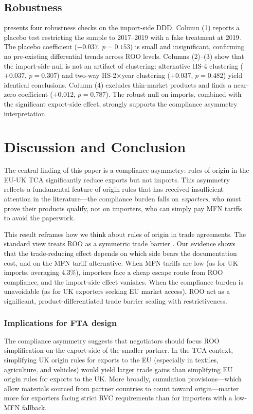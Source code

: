 \documentclass[12pt]{article}
\begin{document}
\subsection{Robustness}



 presents four robustness checks on the import-side DDD. Column (1) reports a placebo test restricting the sample to 2017--2019 with a fake treatment at 2019. The placebo coefficient ($-0.037$, $p = 0.153$) is small and insignificant, confirming no pre-existing differential trends across ROO levels. Columns (2)--(3) show that the import-side null is not an artifact of clustering: alternative HS-4 clustering ($+0.037$, $p = 0.307$) and two-way HS-2$\times$year clustering ($+0.037$, $p = 0.482$) yield identical conclusions. Column (4) excludes thin-market products and finds a near-zero coefficient ($+0.012$, $p = 0.787$). The robust null on imports, combined with the significant export-side effect, strongly supports the compliance asymmetry interpretation.


\section{Discussion and Conclusion}

The central finding of this paper is a compliance asymmetry: rules of origin in the EU-UK TCA significantly reduce exports but not imports. This asymmetry reflects a fundamental feature of origin rules that has received insufficient attention in the literature---the compliance burden falls on \textit{exporters}, who must prove their products qualify, not on importers, who can simply pay MFN tariffs to avoid the paperwork.

This result reframes how we think about rules of origin in trade agreements. The standard view treats ROO as a symmetric trade barrier \citep{krishna2006, conconi2018}. Our evidence shows that the trade-reducing effect depends on which side bears the documentation cost, and on the MFN tariff alternative. When MFN tariffs are low (as for UK imports, averaging 4.3\%), importers face a cheap escape route from ROO compliance, and the import-side effect vanishes. When the compliance burden is unavoidable (as for UK exporters seeking EU market access), ROO act as a significant, product-differentiated trade barrier scaling with restrictiveness.

\subsubsection*{Implications for FTA design} The compliance asymmetry suggests that negotiators should focus ROO simplification on the export side of the smaller partner. In the TCA context, simplifying UK origin rules for exports to the EU (especially in textiles, agriculture, and vehicles) would yield larger trade gains than simplifying EU origin rules for exports to the UK. More broadly, cumulation provisions---which allow materials sourced from partner countries to count toward origin---matter more for exporters facing strict RVC requirements than for importers with a low-MFN fallback.
\end{document}
